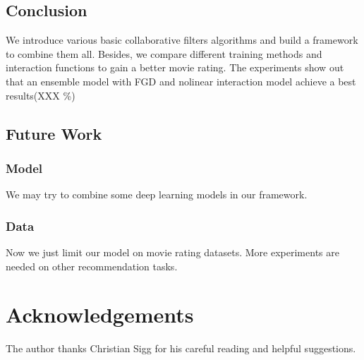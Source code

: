 \documentclass[10pt,conference,compsocconf]{IEEEtran}
\begin{document}
\subsection{Conclusion}
We introduce various basic collaborative filters algorithms and build a framework to combine them all. Besides, we compare different training methods and interaction functions to gain a better movie rating. The experiments show out that an ensemble model with FGD and nolinear interaction model achieve a best results(XXX \%)

\subsection{Future Work} 
\subsubsection{Model} 
We may try to combine some deep learning models in our framework.
\subsubsection{Data} 
Now we just limit our model on movie rating datasets. More experiments are needed on other recommendation tasks.




\section*{Acknowledgements}
The author thanks Christian Sigg for his careful reading and helpful
suggestions.



\end{document}
